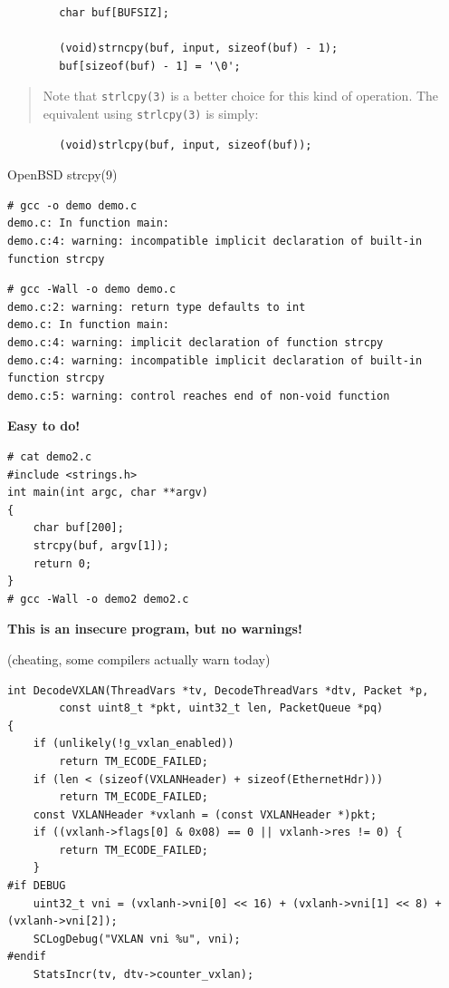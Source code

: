 \documentclass[Screen16to9,17pt]{foils}
\begin{document}
\begin{verbatim}
        char buf[BUFSIZ];

        (void)strncpy(buf, input, sizeof(buf) - 1);
        buf[sizeof(buf) - 1] = '\0';
\end{verbatim}

\begin{quote}
Note that \verb+strlcpy(3)+ is a better choice for this kind of operation.  The
equivalent using \verb+strlcpy(3)+ is simply:
\end{quote}
\begin{verbatim}
        (void)strlcpy(buf, input, sizeof(buf));
\end{verbatim}

OpenBSD strcpy(9)


\begin{verbatim}
# gcc -o demo demo.c
demo.c: In function main:
demo.c:4: warning: incompatible implicit declaration of built-in
function strcpy
\end{verbatim}

\begin{verbatim}
# gcc -Wall -o demo demo.c
demo.c:2: warning: return type defaults to int
demo.c: In function main:
demo.c:4: warning: implicit declaration of function strcpy
demo.c:4: warning: incompatible implicit declaration of built-in
function strcpy
demo.c:5: warning: control reaches end of non-void function
\end{verbatim}

\vskip 15mm
\centerline{\bf\LARGE\color{security6blue}Easy to do!}


\begin{verbatim}
# cat demo2.c
#include <strings.h>
int main(int argc, char **argv)
{
    char buf[200];
    strcpy(buf, argv[1]);
    return 0;
}
# gcc -Wall -o demo2 demo2.c
\end{verbatim}

\vskip 1cm
\centerline{\bf\large\color{security6blue}This is an insecure program, but no warnings!}

(cheating, some compilers actually warn today)




\begin{verbatim}
int DecodeVXLAN(ThreadVars *tv, DecodeThreadVars *dtv, Packet *p,
        const uint8_t *pkt, uint32_t len, PacketQueue *pq)
{
    if (unlikely(!g_vxlan_enabled))
        return TM_ECODE_FAILED;
    if (len < (sizeof(VXLANHeader) + sizeof(EthernetHdr)))
        return TM_ECODE_FAILED;
    const VXLANHeader *vxlanh = (const VXLANHeader *)pkt;
    if ((vxlanh->flags[0] & 0x08) == 0 || vxlanh->res != 0) {
        return TM_ECODE_FAILED;
    }
#if DEBUG
    uint32_t vni = (vxlanh->vni[0] << 16) + (vxlanh->vni[1] << 8) + (vxlanh->vni[2]);
    SCLogDebug("VXLAN vni %u", vni);
#endif
    StatsIncr(tv, dtv->counter_vxlan);
\end{verbatim}
\end{document}

